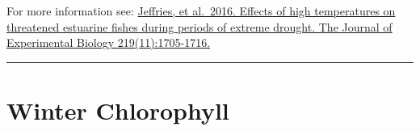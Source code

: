 \documentclass[
]{book}
\begin{document}
\begin{disclaimer}
For more information see:
\href{https://jeb.biologists.org/content/219/11/1705.short}{Jeffries, et
al.~2016. Effects of high temperatures on threatened estuarine fishes
during periods of extreme drought. The Journal of Experimental Biology
219(11):1705-1716.}
\end{disclaimer}

\begin{center}\rule{0.5\linewidth}{0.5pt}\end{center}

\hypertarget{winter-chlorophyll}{%
\section{Winter Chlorophyll}\label{winter-chlorophyll}}
\end{document}
